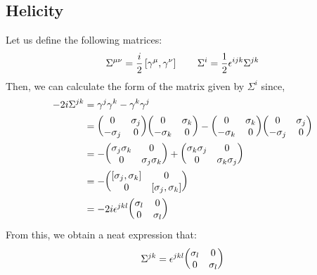 \subsection{Helicity}\label{sec:heli}
Let us define the following matrices:
$$\Sigma^{\mu\nu} =\frac{i}{2} \left[ \gamma^\mu, \gamma^\nu \right]\qquad \Sigma^i = \frac{1}{2}\epsilon^{ijk}\Sigma^{jk}$$
Then, we can calculate the form of the matrix given by $\Sigma^i$ since,
\begin{align*}
    -2i\Sigma^{jk} &= \gamma^j \gamma^k - \gamma^k\gamma^j\\
    &=\gami{j}\gami{k}-\gami{k}\gami{j} \\
    &=- \mqty(\sigma_j\sigma_k & 0\\ 0 & \sigma_j\sigma_k) +\mqty(\sigma_k\sigma_j & 0\\ 0 & \sigma_k\sigma_j)\\
    &= -\mqty(\comtr{\sigma_j}{\sigma_k}& 0\\0 &\comtr{\sigma_j}{\sigma_k})\\
    &= -2i\epsilon^{jkl}\mqty(\sigma_l & 0\\0 & \sigma_l)
\end{align*}
From this, we obtain a neat expression that:
$$\Sigma^{jk} = \epsilon^{jkl}\mqty(\sigma_l & 0\\0 & \sigma_l)$$

